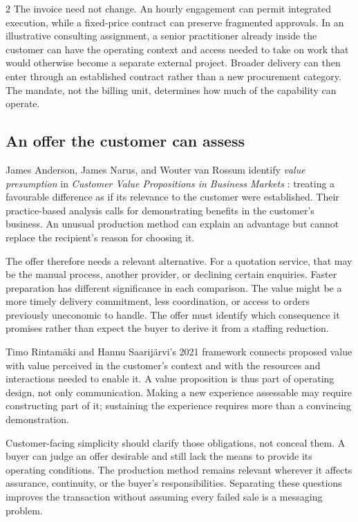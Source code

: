 \begin{multicols}{2}
The invoice need not change. An hourly engagement can permit integrated
execution, while a fixed-price contract can preserve fragmented
approvals. In an illustrative consulting assignment, a senior
practitioner already inside the customer can have the operating context
and access needed to take on work that would otherwise become a separate
external project. Broader delivery can then enter through an established
contract rather than a new procurement category. The mandate, not the
billing unit, determines how much of the capability can operate.

\subsection{An offer the customer can
assess}\label{an-offer-the-customer-can-assess}

James Anderson, James Narus, and Wouter van Rossum identify \emph{value
presumption} in \emph{Customer Value Propositions in Business Markets}
\citep{anderson2006value}: treating a favourable difference as if its
relevance to the customer were established. Their practice-based
analysis calls for demonstrating benefits in the customer's business. An
unusual production method can explain an advantage but cannot replace
the recipient's reason for choosing it.

The offer therefore needs a relevant alternative. For a quotation
service, that may be the manual process, another provider, or declining
certain enquiries. Faster preparation has different significance in each
comparison. The value might be a more timely delivery commitment, less
coordination, or access to orders previously uneconomic to handle. The
offer must identify which consequence it promises rather than expect the
buyer to derive it from a staffing reduction.

Timo Rintamäki and Hannu Saarijärvi's 2021 framework
\citep{rintamaki2021value} connects proposed value with value perceived
in the customer's context and with the resources and interactions needed
to enable it. A value proposition is thus part of operating design, not
only communication. Making a new experience assessable may require
constructing part of it; sustaining the experience requires more than a
convincing demonstration.

Customer-facing simplicity should clarify those obligations, not conceal
them. A buyer can judge an offer desirable and still lack the means to
provide its operating conditions. The production method remains relevant
wherever it affects assurance, continuity, or the buyer's
responsibilities. Separating these questions improves the transaction
without assuming every failed sale is a messaging problem.


\end{multicols}
